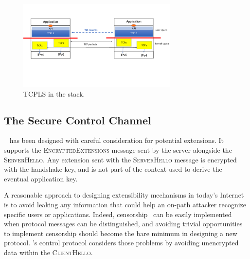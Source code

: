 
\begin{figure}[!t]
  \begin{center}
      \vspace{-1cm}
    \includegraphics[width=8cm]{figures/tcpls-fig2.pdf}
  \end{center}
  \vspace{-1.5cm}
  \caption{TCPLS in the stack.}
  \label{fig:arch}
   \vspace{-0.5cm}
\end{figure}



\subsection{The Secure Control Channel}\label{sec:extending}

~\cite{rfc8446} has been designed with careful consideration for
potential extensions. It supports the \textsc{EncryptedExtensions} message sent
by the server alongside the \textsc{ServerHello}. Any extension sent with the
\textsc{ServerHello} message is encrypted with the handshake key, and is not
part of the context used to derive the eventual application key.

A reasonable approach to designing extensibility mechanisms in today's Internet
is to avoid leaking any information that could help an on-path attacker
recognize specific users or applications. Indeed, censorship~\cite{Morshed2017a,
  Gosain2017a,Chai2019a} can be easily implemented when protocol messages can be
distinguished, and avoiding trivial opportunities to implement censorship should
become the bare minimum in designing a new protocol. \tcpls's control protocol
considers those problems by avoiding unencrypted data within the
\textsc{ClientHello}.

